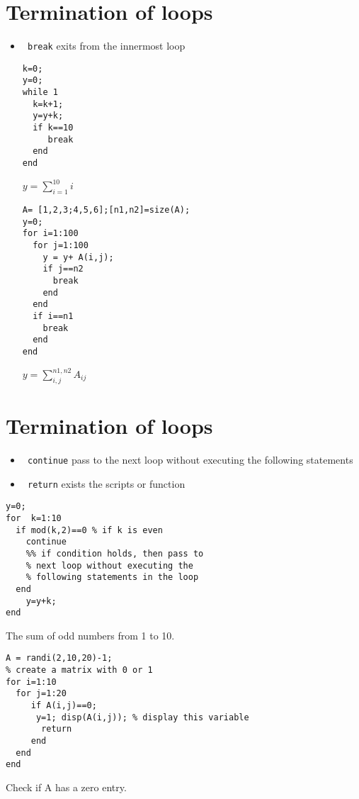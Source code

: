 \documentclass{article}
\begin{document}
 \section{Termination of loops}
   \begin{itemize}
     \item {\tt\color{red} break} exits from the innermost loop
          
\begin{lstlisting}
k=0;
y=0;
while 1
  k=k+1;
  y=y+k;
  if k==10
     break
  end
end
\end{lstlisting}
           $y=\sum_{i=1}^{10}i$               
\begin{lstlisting}
A= [1,2,3;4,5,6];[n1,n2]=size(A);
y=0;
for i=1:100
  for j=1:100
    y = y+ A(i,j);
    if j==n2
      break
    end
  end
  if i==n1
    break
  end
end
\end{lstlisting}
           $y=\sum_{i,j}^{n1,n2}A_{ij}$               
             
   \end{itemize}
 
 

 \section{Termination of loops}
   \begin{itemize}
     \item  {\tt\color{red} continue} pass to the next loop without executing the following statements
     \item  {\tt\color{red} return}  exists  the scripts or function
   \end{itemize}
  
\begin{lstlisting}
y=0;
for  k=1:10
  if mod(k,2)==0 % if k is even 
    continue
    %% if condition holds, then pass to
    % next loop without executing the
    % following statements in the loop 
  end
    y=y+k;
end
\end{lstlisting}
     The sum of odd numbers from 1 to 10.
\begin{lstlisting}
A = randi(2,10,20)-1;
% create a matrix with 0 or 1
for i=1:10
  for j=1:20
     if A(i,j)==0;
      y=1; disp(A(i,j)); % display this variable
       return
     end
  end
end
\end{lstlisting}
     Check if A has a zero entry.
   
 
 
\end{document}
